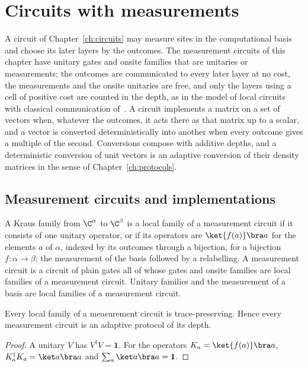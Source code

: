 \chapter{Circuits with measurements}
\label{ch:measurement}

A circuit of Chapter~\ref{ch:circuits} may measure sites in the computational basis and choose
its later layers by the outcomes. The measurement circuits of this chapter have unitary gates
and onsite families that are unitaries or measurements; the outcomes are communicated to every
later layer at no cost, the measurements and the onsite unitaries are free, and only the layers
using a cell of positive cost are counted in the depth, as in the model of local circuits with
classical communication of~\cite{Piroli2021LOCC}. A circuit implements a matrix on a set of
vectors when, whatever the outcomes, it acts there as that matrix up to a scalar, and a vector
is converted deterministically into another when every outcome gives a multiple of the second.
Conversions compose with additive depths, and a deterministic conversion of unit vectors is an
adaptive conversion of their density matrices in the sense of Chapter~\ref{ch:protocols}.

\section{Measurement circuits and implementations}
\label{sec:measurement_model}

\begin{definition}
    \label{def:measurement_circuit}
    \leanok
    A Kraus family from $\C^\alpha$ to $\C^\beta$ is a local family of a measurement circuit if
    it consists of one unitary operator, or if its operators are $\ket{f(a)}\bra a$ for the
    elements $a$ of $\alpha$, indexed by its outcomes through a bijection, for a bijection
    $f\colon\alpha\to\beta$: the measurement of the basis followed by a relabelling. A
    measurement circuit is a circuit of plain gates all of whose gates and onsite families are
    local families of a measurement circuit. Unitary families and the measurement of a basis
    are local families of a measurement circuit.
\end{definition}

\begin{lemma}
    \label{lem:measurement_tp}
    \leanok
    Every local family of a measurement circuit is trace-preserving. Hence every measurement
    circuit is an adaptive protocol of its depth.
\end{lemma}
\begin{proof}
    \leanok
    A unitary $V$ has $V^\dagger V=\mathbf{1}$. For the operators $K_a=\ket{f(a)}\bra a$,
    $K_a^\dagger K_a=\ket a\bra a$ and $\sum_a\ket a\bra a=\mathbf{1}$.
\end{proof}

